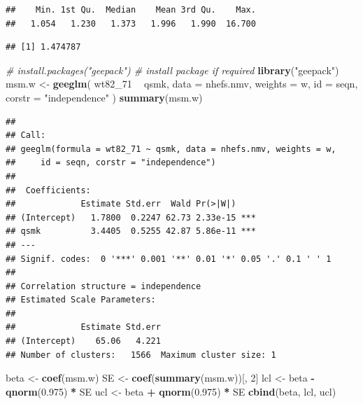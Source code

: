 \documentclass[
  10pt,
]{book}
\newenvironment{Shaded}{\begin{snugshade}}{\end{snugshade}}
\newcommand{\CommentTok}[1]{\textcolor[rgb]{0.56,0.35,0.01}{\textit{#1}}}
\newcommand{\DataTypeTok}[1]{\textcolor[rgb]{0.13,0.29,0.53}{#1}}
\newcommand{\DecValTok}[1]{\textcolor[rgb]{0.00,0.00,0.81}{#1}}
\newcommand{\FloatTok}[1]{\textcolor[rgb]{0.00,0.00,0.81}{#1}}
\newcommand{\KeywordTok}[1]{\textcolor[rgb]{0.13,0.29,0.53}{\textbf{#1}}}
\newcommand{\NormalTok}[1]{#1}
\newcommand{\OperatorTok}[1]{\textcolor[rgb]{0.81,0.36,0.00}{\textbf{#1}}}
\newcommand{\StringTok}[1]{\textcolor[rgb]{0.31,0.60,0.02}{#1}}
\begin{document}
\begin{verbatim}
##    Min. 1st Qu.  Median    Mean 3rd Qu.    Max. 
##   1.054   1.230   1.373   1.996   1.990  16.700
\end{verbatim}

\begin{Shaded}
\end{Shaded}

\begin{verbatim}
## [1] 1.474787
\end{verbatim}

\begin{Shaded}
\begin{Highlighting}[]
\CommentTok{# install.packages("geepack") # install package if required}
\KeywordTok{library}\NormalTok{(}\StringTok{"geepack"}\NormalTok{)}
\NormalTok{msm.w <-}\StringTok{ }\KeywordTok{geeglm}\NormalTok{(}
\NormalTok{  wt82_}\DecValTok{71} \OperatorTok{~}\StringTok{ }\NormalTok{qsmk,}
  \DataTypeTok{data =}\NormalTok{ nhefs.nmv,}
  \DataTypeTok{weights =}\NormalTok{ w,}
  \DataTypeTok{id =}\NormalTok{ seqn,}
  \DataTypeTok{corstr =} \StringTok{"independence"}
\NormalTok{)}
\KeywordTok{summary}\NormalTok{(msm.w)}
\end{Highlighting}
\end{Shaded}

\begin{verbatim}
## 
## Call:
## geeglm(formula = wt82_71 ~ qsmk, data = nhefs.nmv, weights = w, 
##     id = seqn, corstr = "independence")
## 
##  Coefficients:
##             Estimate Std.err  Wald Pr(>|W|)    
## (Intercept)   1.7800  0.2247 62.73 2.33e-15 ***
## qsmk          3.4405  0.5255 42.87 5.86e-11 ***
## ---
## Signif. codes:  0 '***' 0.001 '**' 0.01 '*' 0.05 '.' 0.1 ' ' 1
## 
## Correlation structure = independence 
## Estimated Scale Parameters:
## 
##             Estimate Std.err
## (Intercept)    65.06   4.221
## Number of clusters:   1566  Maximum cluster size: 1
\end{verbatim}

\begin{Shaded}
\begin{Highlighting}[]
\NormalTok{beta <-}\StringTok{ }\KeywordTok{coef}\NormalTok{(msm.w)}
\NormalTok{SE <-}\StringTok{ }\KeywordTok{coef}\NormalTok{(}\KeywordTok{summary}\NormalTok{(msm.w))[, }\DecValTok{2}\NormalTok{]}
\NormalTok{lcl <-}\StringTok{ }\NormalTok{beta }\OperatorTok{-}\StringTok{ }\KeywordTok{qnorm}\NormalTok{(}\FloatTok{0.975}\NormalTok{) }\OperatorTok{*}\StringTok{ }\NormalTok{SE}
\NormalTok{ucl <-}\StringTok{ }\NormalTok{beta }\OperatorTok{+}\StringTok{ }\KeywordTok{qnorm}\NormalTok{(}\FloatTok{0.975}\NormalTok{) }\OperatorTok{*}\StringTok{ }\NormalTok{SE}
\KeywordTok{cbind}\NormalTok{(beta, lcl, ucl)}
\end{Highlighting}
\end{Shaded}
\end{document}
